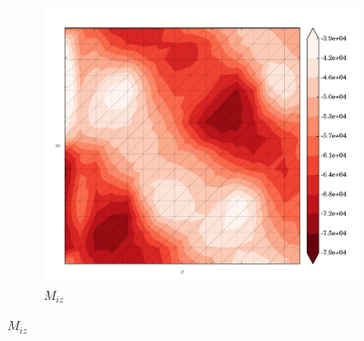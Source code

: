 \begin{figure}
  \begin{subfigure}[b]{0.3\linewidth}
    \includegraphics[width=\linewidth]{images/stress_balance/FS/M_iz.pdf}
  \caption{$M_{iz}$}
  \label{fs_M_iz}
  \end{subfigure}


\end{figure}
